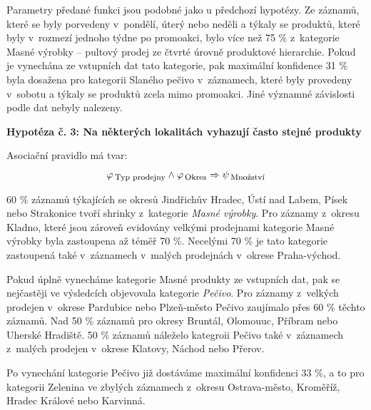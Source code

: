 Parametry předané funkci jsou podobné jako u předchozí hypotézy. Ze záznamů, které se byly porvedeny v~pondělí, úterý nebo neděli a týkaly se produktů, které byly v~rozmezí  jednoho týdne po promoakci, bylo více než 75 \% z~kategorie Masné výrobky -- pultový prodej ze čtvrté úrovně produktové hierarchie. Pokud je vynechána ze vstupních dat tato kategorie, pak maximální konfidence 31 \% byla dosažena pro kategorii Slaného pečivo v~záznamech, které byly provedeny v~sobotu a týkaly se produktů zcela mimo promoakci. Jiné významné závislosti podle dat nebyly nalezeny.

\vspace*{1em}

\textbf{Hypotéza č. 3: Na některých lokalitách vyhazují často stejné produkty}

Asociační pravidlo má tvar:
\begin{equation}
    \varphi_{\mbox{\,\footnotesize Typ prodejny}} \land \varphi_{\,\mbox{\footnotesize Okres}} \Rightarrow \psi_{\mbox{\,\footnotesize Množství}}
\end{equation}

60 \% záznamů týkajících se okresů Jindřichův Hradec, Ústí nad Labem, Písek nebo Strakonice tvoří shrinky z~kategorie \emph{Masné výrobky}. Pro záznamy z~okresu Kladno, které jsou zároveň evidovány velkými prodejnami kategorie Masné výrobky byla zastoupena až téměř 70 \%. Necelými 70 \% je tato kategorie zastoupená také v~záznamech v~malých prodejnách v~okrese Praha-východ.

Pokud úplně vynecháme kategorie Masné produkty ze vstupních dat, pak se nejčastěji ve výsledcích objevovala kategorie \emph{Pečivo}. Pro záznamy z~velkých prodejen v~okrese Pardubice nebo Plzeň-město Pečivo zaujímalo přes 60 \% těchto záznamů. Nad 50 \% záznamů pro okresy Bruntál, Olomouuc, Příbram nebo Uherské Hradiště. 50 \% záznamů náleželo kategroii Pečivo také v~záznamech z~malých prodejen v~okrese Klatovy, Náchod nebo Přerov.

Po vynechání kategorie Pečivo již dostáváme maximální konfidenci 33 \%, a to pro kategorii Zelenina ve zbylých záznamech z~okresu Ostrava-město, Kroměříž, Hradec Králové nebo Karvinná.

\vspace*{1em}



